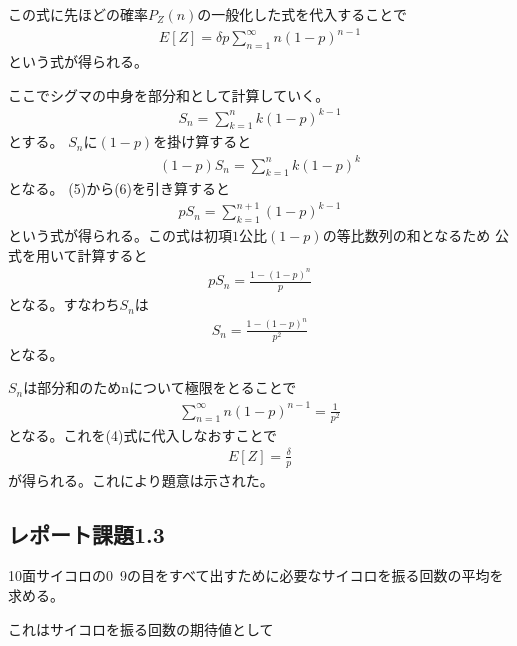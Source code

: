 \documentclass[a4paper,11pt,dvipdfmx]{jsarticle}
\begin{document}
この式に先ほどの確率$P_Z(n)$の一般化した式を代入することで
\begin{align}
    E[Z] = \delta p\sum_{n=1}^{\infty}n(1-p)^{n-1}
\end{align}
という式が得られる。

ここでシグマの中身を部分和として計算していく。
\begin{align}
    S_n = \sum_{k=1}^{n}k(1-p)^{k-1}
\end{align}
とする。
$S_n$に$(1-p)$を掛け算すると
\begin{align}
    (1-p)S_n = \sum_{k=1}^{n}k(1-p)^k
\end{align}
となる。
(5)から(6)を引き算すると
\begin{align}
    pS_n = \sum_{k=1}^{n+1}(1-p)^{k-1}
\end{align}
という式が得られる。この式は初項$1$公比$(1-p)$の等比数列の和となるため
公式を用いて計算すると
\begin{align}
    pS_n = \frac{1-(1-p)^n}{p}
\end{align}
となる。すなわち$S_n$は
\begin{align}
    S_n = \frac{1-(1-p)^n}{p^2}
\end{align}
となる。

$S_n$は部分和のためnについて極限をとることで
\begin{align}
    \sum_{n=1}^{\infty}n(1-p)^{n-1} = \frac{1}{p^2}
\end{align}
となる。これを(4)式に代入しなおすことで
\begin{align}
    E[Z] = \frac{\delta}{p}
\end{align}
が得られる。これにより題意は示された。

\subsection*{レポート課題1.3}
10面サイコロの0~9の目をすべて出すために必要なサイコロを振る回数の平均を求める。

これはサイコロを振る回数の期待値として
\end{document}
